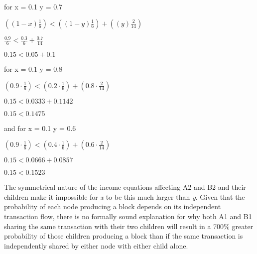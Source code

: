 \documentclass[oneside]{article}   	%
\begin{document}
\begin{multicols}{2}
for x = 0.1 y = 0.7

\normalsize
\begin{adjustwidth}{1.5em}{1.5em} 
	\begin{math}
\left( \left( 1 - x \right) \frac{1}{6} \right) < \left( \left( 1 - y \right) \frac{1}{6} \right) + \left( \left( y \right) \frac{2}{14} \right)
	\end{math}

	\begin{math}
\frac{0.9}{6} < \frac{0.3}{6} + \frac{0.7}{14}
	\end{math}

	\begin{math}
0.15 < 0.05 + 0.1
	\end{math}
\end{adjustwidth}
\normalsize

for x = 0.1 y = 0.8

\normalsize
\begin{adjustwidth}{1.5em}{1.5em} 
	\begin{math}
\left( 0.9 \cdot \frac{1}{6} \right) < \left( 0.2 \cdot \frac{1}{6} \right) + \left( 0.8 \cdot \frac{2}{14} \right)
	\end{math}

	\begin{math}
0.15 < 0.0333 + 0.1142
	\end{math}

	\begin{math}
0.15 < 0.1475
	\end{math}
\end{adjustwidth}
\normalsize

and for x = 0.1 y = 0.6

\normalsize
\begin{adjustwidth}{1.5em}{1.5em} 
	\begin{math}
\left( 0.9 \cdot \frac{1}{6} \right) < \left( 0.4 \cdot \frac{1}{6} \right) + \left( 0.6 \cdot \frac{2}{14} \right)
	\end{math}

	\begin{math}
0.15 < 0.0666 + 0.0857
	\end{math}

	\begin{math}
0.15 < 0.1523
	\end{math}
\end{adjustwidth}
\normalsize

The symmetrical nature of the income equations affecting A2 and B2 and their children make it impossible for \textit{x} to be this much larger than \textit{y}. Given that the probability of each node producing a block depends on its independent transaction flow, there is no formally sound explanation for why both A1 and B1 sharing the same transaction with their two children will result in a 700\% greater probability of those children producing a block than if the same transaction is independently shared by either node with either child alone.


\end{multicols}
\end{document}

